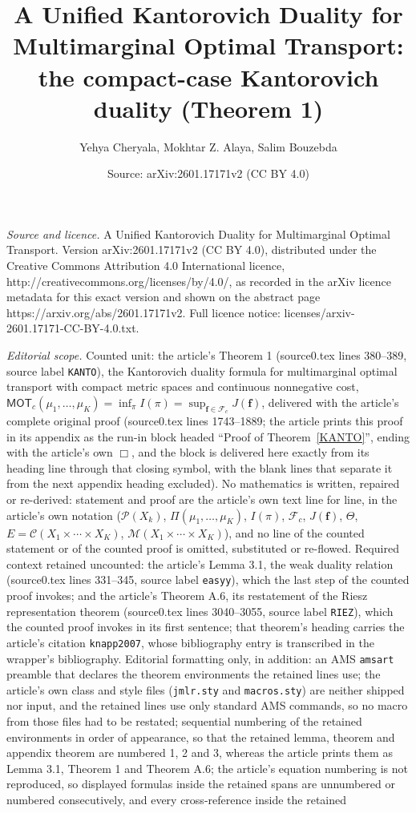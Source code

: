 \documentclass[10pt,a4paper]{amsart}
\title[A Unified Kantorovich Duality for Multimarginal Optimal Transport]{A Unified Kantorovich Duality for Multimarginal Optimal Transport: the compact-case Kantorovich duality (Theorem 1)}
\author{Yehya Cheryala, Mokhtar Z. Alaya, Salim Bouzebda}
\date{Source: arXiv:2601.17171v2 (CC BY 4.0)}
\theoremstyle{plain}
\theoremstyle{definition}
\theoremstyle{remark}
\begin{document}
\maketitle

\noindent\emph{Source and licence.} A Unified Kantorovich Duality for Multimarginal Optimal Transport. Version arXiv:2601.17171v2 (CC BY 4.0), distributed under the Creative Commons Attribution 4.0 International licence, http://creativecommons.org/licenses/by/4.0/, as recorded in the arXiv licence metadata for this exact version and shown on the abstract page https://arxiv.org/abs/2601.17171v2. Full licence notice: licenses/arxiv-2601.17171-CC-BY-4.0.txt.\par\smallskip

\noindent\textit{Editorial scope.} Counted unit: the article's Theorem 1 (source0.tex lines 380--389, source label \texttt{KANTO}), the Kantorovich duality formula for multimarginal optimal transport with compact metric spaces and continuous nonnegative cost, $\mathsf{MOT}_c(\mu_1,\ldots,\mu_K)=\inf_\pi I(\pi)=\sup_{\boldsymbol f\in\mathcal{F}_c}J(\boldsymbol f)$, delivered with the article's complete original proof (source0.tex lines 1743--1889; the article prints this proof in its appendix as the run-in block headed ``Proof of Theorem~\ref{KANTO}'', ending with the article's own $\Box$, and the block is delivered here exactly from its heading line through that closing symbol, with the blank lines that separate it from the next appendix heading excluded). No mathematics is written, repaired or re-derived: statement and proof are the article's own text line for line, in the article's own notation ($\mathcal{P}(X_k)$, $\Pi(\mu_1,\dots,\mu_K)$, $I(\pi)$, $\mathcal{F}_c$, $J(\boldsymbol f)$, $\Theta$, $E=\mathcal{C}(X_1\times\cdots\times X_K)$, $\mathcal{M}(X_1\times\cdots\times X_K)$), and no line of the counted statement or of the counted proof is omitted, substituted or re-flowed. Required context retained uncounted: the article's Lemma 3.1, the weak duality relation (source0.tex lines 331--345, source label \texttt{easyy}), which the last step of the counted proof invokes; and the article's Theorem A.6, its restatement of the Riesz representation theorem (source0.tex lines 3040--3055, source label \texttt{RIEZ}), which the counted proof invokes in its first sentence; that theorem's heading carries the article's citation \texttt{knapp2007}, whose bibliography entry is transcribed in the wrapper's bibliography. Editorial formatting only, in addition: an AMS \texttt{amsart} preamble that declares the theorem environments the retained lines use; the article's own class and style files (\texttt{jmlr.sty} and \texttt{macros.sty}) are neither shipped nor input, and the retained lines use only standard AMS commands, so no macro from those files had to be restated; sequential numbering of the retained environments in order of appearance, so that the retained lemma, theorem and appendix theorem are numbered 1, 2 and 3, whereas the article prints them as Lemma 3.1, Theorem 1 and Theorem A.6; the article's equation numbering is not reproduced, so displayed formulas inside the retained spans are unnumbered or numbered consecutively, and every cross-reference inside the retained 
\end{document}

